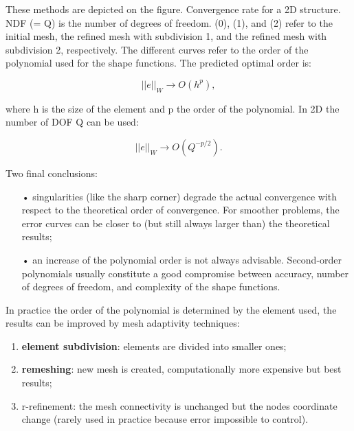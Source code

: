 	These methods are depicted on the figure. 
	Convergence rate for a 2D structure. NDF (= Q) is the number of degrees of freedom. (0), (1), and (2) refer to the initial mesh, the refined mesh with subdivision 1, and the refined mesh with subdivision 2, respectively. The different curves refer to the order of the polynomial used for the shape functions. The predicted optimal order is: 
	
	\begin{equation}
	||e||_W \rightarrow O(h^p),
	\end{equation}
	
	where h is the size of the element and p the order of the polynomial. In 2D the number of DOF Q can be used: 
		
	\begin{equation}
	||e||_W \rightarrow O(Q^{-p/2}).
	\end{equation}
	
	Two final conclusions: 
	
	\begin{itemize}
	\item[•] singularities (like the sharp corner) degrade the actual convergence with respect to the theoretical order of convergence. For smoother problems, the error curves can be closer to (but still always larger than) the theoretical results;
	
	\item[•] an increase of the polynomial order is not always advisable. Second-order polynomials usually constitute a good compromise between accuracy, number of degrees of freedom, and complexity of the shape functions.
	\end{itemize}
	
	In practice the order of the polynomial is determined by the element used, the results can be improved by mesh adaptivity techniques: 
	
	\begin{enumerate}
	\item \textbf{element subdivision}: elements are divided into smaller ones;
	\item \textbf{remeshing}: new mesh is created, computationally more expensive but best results; 
	\item r-refinement: the mesh connectivity is unchanged but the nodes coordinate change (rarely used in practice because error impossible to control). 
	\end{enumerate}
	